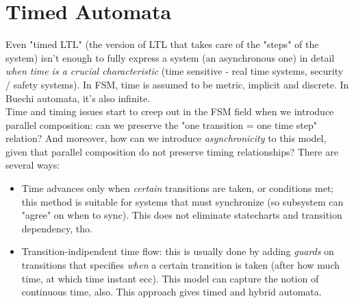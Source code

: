 \documentclass{article}
\begin{document}
		\section{Timed Automata}
			Even "timed LTL" (the version of LTL that takes care of the "steps" of the system) isn't enough to fully express a system (an asynchronous one) in detail \emph{when time is a crucial characteristic} (time sensitive - real time systems, security / safety systems). In FSM, time is assumed to be metric, implicit and discrete. In Buechi automata, it's also infinite.\\
			Time and timing issues start to creep out in the FSM field when we introduce parallel composition: can we preserve the "one transition = one time step" relation? And moreover, how can we introduce \emph{asynchronicity} to this model, given that parallel composition do not preserve timing relationships? There are several ways:
			\begin{itemize}
				\item Time advances only when \emph{certain} transitions are taken, or conditions met; this method is suitable for systems that must synchronize (so subsystem can "agree" on when to sync). This does not eliminate statecharts and transition dependency, tho.
				\item Transition-indipendent time flow: this is usually done by adding \emph{guards} on transitions that specifies \emph{when} a certain transition is taken (after how much time, at which time instant ecc). This model can capture the notion of continuous time, also. This approach gives timed and hybrid automata.
			\end{itemize}
			
\end{document}
